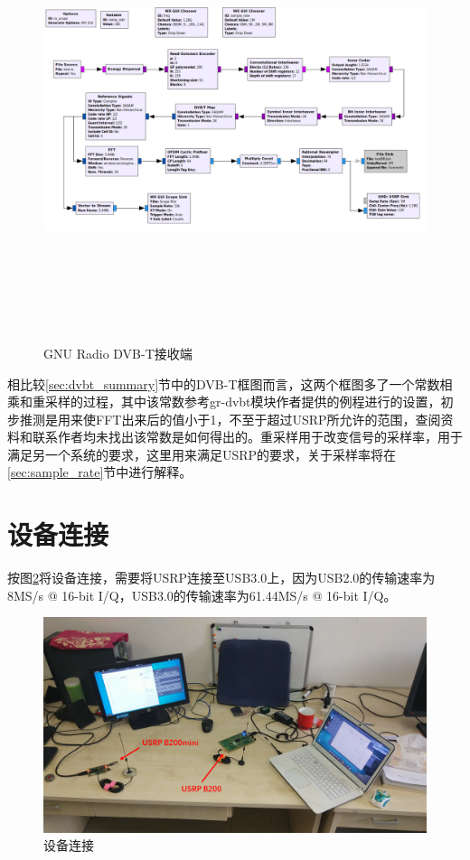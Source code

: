 		\begin{figure}[htbp]
			\centering
			\includegraphics[height=13cm,angle=-90]{figures/gnuradio_dvbt_tx.png}
			\caption{GNU Radio DVB-T接收端}
			\label{fig:gnuradio_dvbt_rx}
		\end{figure}
		\par 相比较\ref{sec:dvbt_summary}节中的DVB-T框图而言，这两个框图多了一个常数相乘和重采样的过程，其中该常数参考gr-dvbt模块作者提供的例程进行的设置，初步推测是用来使FFT出来后的值小于1，不至于超过USRP所允许的范围，查阅资料和联系作者均未找出该常数是如何得出的。重采样用于改变信号的采样率，用于满足另一个系统的要求，这里用来满足USRP的要求，关于采样率将在\ref{sec:sample_rate}节中进行解释。
	\section{设备连接}
		\par 按图\ref{fig:devices}将设备连接，需要将USRP连接至USB3.0上，因为USB2.0的传输速率为8MS/s @ 16-bit I/Q，USB3.0的传输速率为61.44MS/s @ 16-bit I/Q。
		\begin{figure}[htp]
			\centering
			\includegraphics[width=13cm]{figures/dvbt_x86.png}
			\caption{设备连接}
			\label{fig:devices}
		\end{figure}
